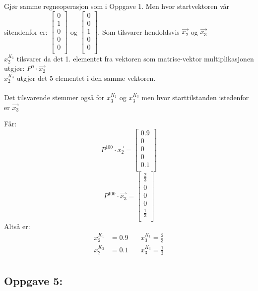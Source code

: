 \documentclass[a4paper, norsk, twoside, 10pt]{article}
\begin{document}
\begin{flushleft}
  Gjør samme regneoperasjon som i Oppgave 1. Men hvor startvektoren vår sitendenfor er:
  $\begin{bmatrix}
    0 \\
    1 \\
    0 \\
    0 \\
    0 \\
  \end{bmatrix}$
  og
    $\begin{bmatrix}
    0 \\
    0 \\
    1 \\
    0 \\
    0 \\
    \end{bmatrix}$.
  Som tilsvarer hendoldsvis $\vec{x_{2}}$ og $\vec{x_{3}}$\\
  $x_{2}^{K_{1}}$ tilsvarer da det 1. elementet fra vektoren som matrise-vektor multiplikasjonen utgjør: $P^{n}\cdot \vec{x_{2}}$ \\$x_{2}^{K_{3}}$ utgjør det 5 elementet i den samme vektoren. \\ \ \\
  Det tilsvarende stemmer også for $x_{3}^{K_{1}}$ og $x_{3}^{K_{3}}$ men hvor starttilstanden istedenfor er $\vec{x_{3}}$

  Får:
  \[ P^{100}\cdot \vec{x_{2}} = \begin{bmatrix}
    0.9 \\
    0 \\
    0 \\
    0 \\
    0.1 \\
  \end{bmatrix} \]
  \[P^{100}\cdot \vec{x_{3}} = \begin{bmatrix}
    \frac{2}{3} \\
    0 \\
    0 \\
    0 \\
    \frac{1}{3} \\
  \end{bmatrix}
  \]
  Altså er:
  \begin{align*} x_{2}^{K_{1}} &= 0.9 \quad &x_{3}^{K_{1}} = \frac{2}{3} \\
    x_{2}^{K_{3}} &= 0.1 \quad &x_{3}^{K_{3}} = \frac{1}{3} \\
  \end{align*}


  \subsection*{Oppgave 5:}
  

\end{flushleft}
\end{document}
